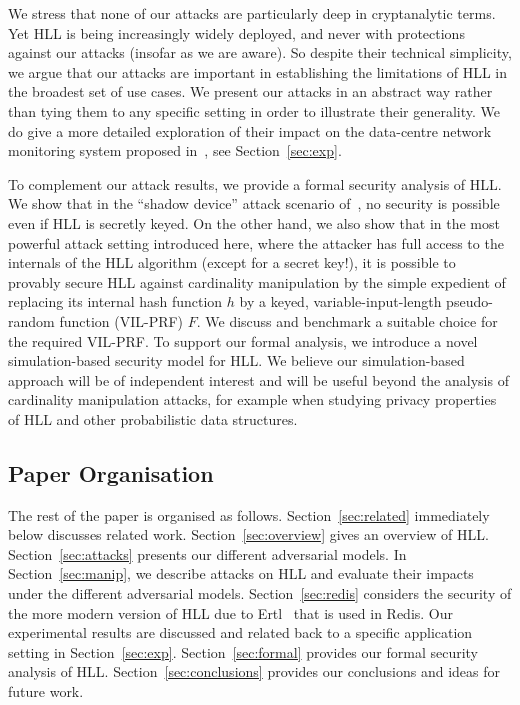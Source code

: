 \documentclass[sigconf, anonymous, dvipsnames]{acmart} %
\begin{document}
We stress that none of our attacks are particularly deep in cryptanalytic terms. Yet HLL is being increasingly widely deployed, and never with protections against our attacks (insofar as we are aware). So despite their technical simplicity, we argue that our attacks are important in establishing the limitations of HLL in the broadest set of use cases. We present our attacks in an abstract way rather than tying them to any specific setting in order to illustrate their generality. We do give a more detailed exploration of their impact on the data-centre network monitoring system proposed in~\cite{flexswitch}, see Section~\ref{sec:exp}. 

To complement our attack results, we provide a formal security analysis of HLL. We show that in the ``shadow device'' attack scenario of~\cite{hllvuln}, no security is possible even if HLL is secretly keyed. On the other hand, we also show that in the most powerful attack setting introduced here, where the attacker has full access to the internals of the HLL algorithm (except for a secret key!), it is possible to provably secure HLL against cardinality manipulation by the simple expedient of replacing its internal hash function $h$ by a keyed, variable-input-length pseudo-random function (VIL-PRF) $F$. We discuss and benchmark a suitable choice for the required VIL-PRF. To support our formal analysis, we introduce a novel simulation-based security model for HLL. We believe our simulation-based approach will be of independent interest and will be useful beyond the analysis of cardinality manipulation attacks, for example when studying privacy properties of HLL and other probabilistic data structures. 

\subsection{Paper Organisation}
The rest of the paper is organised as follows. Section~\ref{sec:related} immediately below discusses related work. Section~\ref{sec:overview} gives an overview of HLL. Section~\ref{sec:attacks} presents our different adversarial models. In Section~\ref{sec:manip}, we describe attacks on HLL and evaluate their impacts under the different adversarial models. Section~\ref{sec:redis} considers the security of the more modern version of HLL due to Ertl~\cite{hllnew} that is used in Redis. Our experimental results are discussed and related back to a specific application setting in Section~\ref{sec:exp}. Section~\ref{sec:formal} provides our formal security analysis of HLL. Section~\ref{sec:conclusions} provides our conclusions and ideas for future work.
\end{document}
